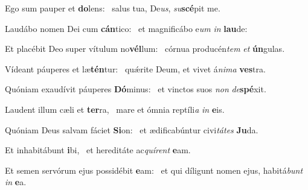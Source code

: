 \item Ego sum pauper et \textbf{do}lens:~\psstar{} salus tua, De\textit{us}, \textit{su}\textbf{scé}pit me.
\item Laudábo nomen Dei cum \textbf{cán}tico:~\psstar{} et magnificábo e\textit{um} \textit{in} \textbf{lau}de:
\item Et placébit Deo super vítulum no\textbf{vél}lum:~\psstar{} córnua producén\textit{tem} \textit{et} \textbf{ún}gulas.
\item Vídeant páuperes et læ\textbf{tén}\-tur:~\psstar{} quǽrite Deum, et vivet á\textit{nima} \textbf{ves}tra.
\item Quóniam exaudívit páuperes \textbf{Dó}minus:~\psstar{} et vinctos suos \textit{non} \textit{de}\textbf{spé}xit.
\item Laudent illum cæli et \textbf{ter}ra,~\psstar{} mare et ómnia reptíli\textit{a} \textit{in} \textbf{e}is.
\item Quóniam Deus salvam fáciet \textbf{Si}on:~\psstar{} et ædificabúntur civi\textit{tátes} \textbf{Ju}da.
\item Et inhabitábunt \textbf{i}bi,~\psstar{} et hereditáte ac\textit{quírent} \textbf{e}am.
\item Et semen servórum ejus possidébit \textbf{e}am:~\psstar{} et qui díligunt nomen ejus, habitá\textit{bunt} \textit{in} \textbf{e}a.
